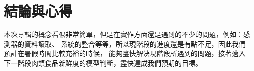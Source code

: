 \chapter{結論與心得}

本次專輯的概念看似非常簡單，但是在實作方面還是遇到的不少的問題，例如：感測器的資料讀取、
系統的整合等等，所以現階段的進度還是有點不足，因此我們預計在暑假時間比較充裕的時候，
能夠盡快解決現階段所遇到的問題，接著邁入下一階段肉類食品新鮮度的模型判斷，盡快達成我們預期的目標。